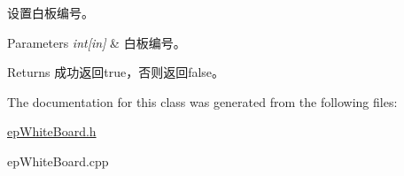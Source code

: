 设置白板编号。 


\begin{DoxyParams}{\-Parameters}
{\em int\mbox{[}in\mbox{]}} & 白板编号。\\
\hline
\end{DoxyParams}
\begin{DoxyReturn}{\-Returns}
成功返回true，否则返回false。 
\end{DoxyReturn}


\-The documentation for this class was generated from the following files\-:\begin{DoxyCompactItemize}
\item 
\hyperlink{epWhiteBoard_8h}{ep\-White\-Board.\-h}\item 
ep\-White\-Board.\-cpp\end{DoxyCompactItemize}
